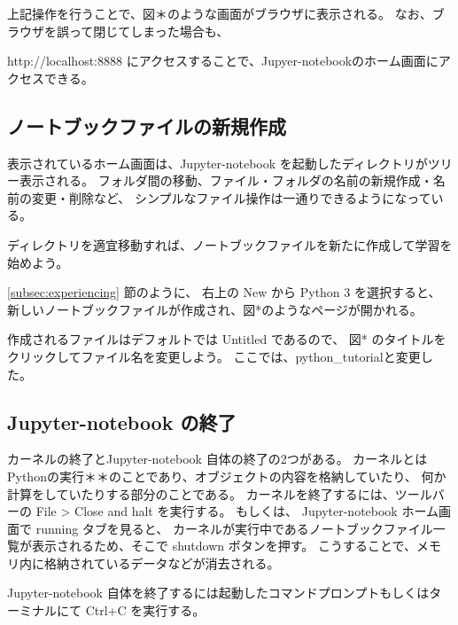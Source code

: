 上記操作を行うことで、図＊のような画面がブラウザに表示される。
なお、ブラウザを誤って閉じてしまった場合も、

\noindent
{\ttfamily
http://localhost:8888
}
にアクセスすることで、Jupyer-notebookのホーム画面にアクセスできる。


\subsection{ノートブックファイルの新規作成}
表示されているホーム画面は、Jupyter-notebook を起動したディレクトリがツリー表示される。
フォルダ間の移動、ファイル・フォルダの名前の新規作成・名前の変更・削除など、
シンプルなファイル操作は一通りできるようになっている。

ディレクトリを適宜移動すれば、ノートブックファイルを新たに作成して学習を始めよう。

\ref{subsec:experiencing} 節のように、
右上の {\ttfamily New} から {\ttfamily Python 3} を選択すると、
新しいノートブックファイルが作成され、図*のようなページが開かれる。

作成されるファイルはデフォルトでは {\ttfamily Untitled} であるので、
図* のタイトルをクリックしてファイル名を変更しよう。
ここでは、{\ttfamily python_tutorial}と変更した。

\subsection{Jupyter-notebook の終了}
カーネルの終了とJupyter-notebook 自体の終了の2つがある。
カーネルとはPythonの実行＊＊のことであり、オブジェクトの内容を格納していたり、
何か計算をしていたりする部分のことである。
カーネルを終了するには、ツールバーの {\ttfamily File > Close and halt} を実行する。
もしくは、
Jupyter-notebook ホーム画面で {\ttfamily running} タブを見ると、
カーネルが実行中であるノートブックファイル一覧が表示されるため、そこで {\ttfamily shutdown}
ボタンを押す。
%
こうすることで、メモリ内に格納されているデータなどが消去される。

Jupyter-notebook 自体を終了するには起動したコマンドプロンプトもしくはターミナルにて
Ctrl+C を実行する。

